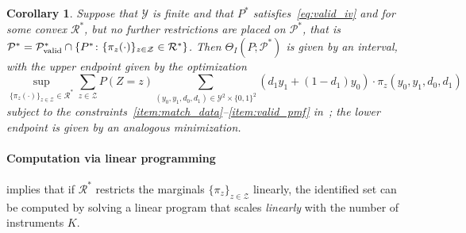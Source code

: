 \documentclass[12pt]{article}%
\newtheorem{corollary}{Corollary}
\theoremstyle{definition}
\newcommand\1{\operatorname{I}\indicatorfence}
\begin{document}
\begin{corollary}\label{cor:optmize_over_pi}
  Suppose that $\mathcal{Y}$ is finite and that $P^{*}$
  satisfies~\cref{eq:valid_iv} and
   for some convex $\mathcal{R}^{*}$,
  but no further restrictions are placed on $\mathcal{P}^{*}$, that is
  $\mathcal{P}^{*}=\mathcal{P}^{*}_{\textnormal{valid}}\cap \{P^{*}\colon
  \{\pi_{z}(\cdot)\}_{z \in \mathcal{Z}}\in\mathcal{R}^{*}\}$. Then
  ${\Theta}_{I}(P;\mathcal{P}^{*})$ is given by an interval, with the upper
  endpoint given by the optimization
  \begin{equation}\label{eq:theta_value}
    \sup_{\{\pi_{z}(\cdot) \}_{z \in \mathcal{Z}} \in \mathcal{R}^*} \sum_{z \in \mathcal{Z}} P(Z=z)
    \sum_{(y_0, y_1, d_0, d_1) \in \mathcal{Y}^2 \times \{0,1\}^2} \left(d_1 y_1 +
      (1-d_1)y_0 \right) \cdot \pi_{z}(y_0, y_1, d_0, d_1)
  \end{equation}
  subject to the constraints~\ref{item:match_data}--\ref{item:valid_pmf}
  in~; the lower endpoint is given by an analogous
  minimization.
\end{corollary}

\paragraph{Computation via linear programming}\label{sec:lp_implementation}

 implies that if $\mathcal{R}^*$ restricts the
marginals $\{\pi_z\}_{z \in \mathcal{Z}}$ linearly, the identified set can be
computed by solving a linear program that scales \emph{linearly} with the number
of instruments $K$.
\end{document}
